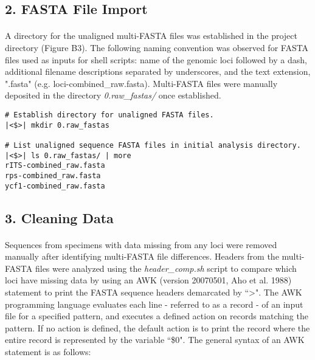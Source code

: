 \subsection*{2. FASTA File Import}

\paragraph{} A directory for the unaligned multi-FASTA files was established in the project directory (Figure B3).  The following naming convention was observed for FASTA files used as inputs for shell scripts: name of the genomic loci followed by a dash, additional filename descriptions separated by underscores, and the text extension, ".fasta" (e.g. loci-combined\_raw.fasta).  Multi-FASTA files were manually deposited in the directory \textit{0.raw\_fastas/} once established.

\clearpage

\begin{lstlisting}[caption={Unaligned sequence data deposited in \textit{0.raw\_fastas/} subdirectory.}]
# Establish directory for unaligned FASTA files.
|<$>| mkdir 0.raw_fastas

# List unaligned sequence FASTA files in initial analysis directory.
|<$>| ls 0.raw_fastas/ | more
rITS-combined_raw.fasta
rps-combined_raw.fasta
ycf1-combined_raw.fasta
\end{lstlisting}

\vspace*{36pt}

\subsection*{3. Cleaning Data}

\paragraph{} Sequences from specimens with data missing from any loci were removed manually after identifying multi-FASTA file differences.  Headers from the multi-FASTA files were analyzed using the \textit{header\_comp.sh} script to compare which loci have missing data by using an AWK (version 20070501, Aho et al. 1988) statement to print the FASTA sequence headers demarcated by ``>".  The AWK programming language evaluates each line - referred to as a record - of an input file for a specified pattern, and executes a defined action on records matching the pattern.  If no action is defined, the default action is to print the record where the entire record is represented by the variable ``\$0".  The general syntax of an AWK statement is as follows:  

